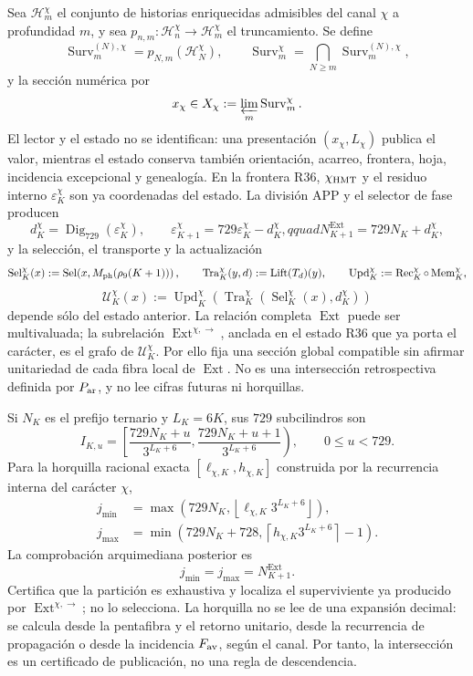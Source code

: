 Sea \(\mathcal H_m^\chi\) el conjunto de historias enriquecidas admisibles
del canal \(\chi\) a profundidad \(m\), y sea
\(p_{n,m}:\mathcal H_n^\chi\to\mathcal H_m^\chi\) el truncamiento. Se define
\[
 \operatorname{Surv}_{m}^{(N),\chi}
 =p_{N,m}(\mathcal H_N^\chi),\qquad
 \operatorname{Surv}_{m}^{\chi}
 =\bigcap_{N\ge m}\operatorname{Surv}_{m}^{(N),\chi},
\]
y la sección numérica por
\[
 x_\chi\in X_\chi:=
 \varprojlim_m\operatorname{Surv}_m^\chi.
\]
El lector y el estado no se identifican: una presentación
\((x_\chi,L_\chi)\) publica el valor, mientras el estado conserva también
orientación, acarreo, frontera, hoja, incidencia excepcional y genealogía.
En la frontera R36, \(\chi_{\rm HMT}\) y el residuo interno
\(\varepsilon_K^\chi\) son ya coordenadas del estado. La división APP y el
selector de fase producen
\[
 d_K^\chi=\operatorname{Dig}_{729}(\varepsilon_K^\chi),\qquad
 \varepsilon_{K+1}^\chi=729\varepsilon_K^\chi-d_K^\chi,qquad
 N_{K+1}^{\operatorname{Ext}}=729N_K+d_K^\chi,
\]
y la selección, el transporte y la actualización
\[
 \operatorname{Sel}_K^\chi(x)
 :=\operatorname{Sel}\!\left(
 x,M_{\rm ph}(\rho_9(K+1))\right),
 \qquad
 \operatorname{Tra}_K^\chi(y,d):=\operatorname{Lift}(T_d)(y),
 \qquad
 \operatorname{Upd}_K^\chi:=\operatorname{Rec}_K^\chi\circ
 \operatorname{Mem}_K^\chi,
\]
\[
 \mathcal U_K^\chi(x)
 :=\operatorname{Upd}_K^\chi\!\left(
  \operatorname{Tra}_K^\chi\!\left(
   \operatorname{Sel}_K^\chi(x),d_K^\chi
  \right)\right)
\]
depende sólo del estado anterior. La relación completa
\(\operatorname{Ext}\) puede ser multivaluada; la subrelación
\(\operatorname{Ext}^{\chi,\rightarrow}\), anclada en el estado R36 que ya
porta el carácter, es el grafo de \(\mathcal U_K^\chi\). Por ello fija
una sección global compatible sin afirmar unitariedad de cada fibra local de
\(\operatorname{Ext}\). No es una intersección retrospectiva definida por
\(P_{\rm ar}\), y no lee cifras futuras ni horquillas.

Si \(N_K\) es el prefijo ternario y \(L_K=6K\), sus \(729\) subcilindros son
\[
 I_{K,u}=
 \left[
 \frac{729N_K+u}{3^{L_K+6}},
 \frac{729N_K+u+1}{3^{L_K+6}}
 \right),
 \qquad 0\le u<729.
\]
Para la horquilla racional exacta \([\ell_{\chi,K},h_{\chi,K}]\) construida
por la recurrencia interna del carácter \(\chi\),
\[
\begin{aligned}
j_{\min}
 &=\max\!\left(729N_K,
   \left\lfloor\ell_{\chi,K}3^{L_K+6}\right\rfloor\right),\\
j_{\max}
 &=\min\!\left(729N_K+728,
   \left\lceil h_{\chi,K}3^{L_K+6}\right\rceil-1\right).
\end{aligned}
\]
La comprobación arquimediana posterior es
\[
 j_{\min}=j_{\max}=N_{K+1}^{\operatorname{Ext}}.
\]
Certifica que la partición es exhaustiva y localiza el superviviente ya
producido por \(\operatorname{Ext}^{\chi,\rightarrow}\); no lo selecciona.
La horquilla no se lee de una expansión decimal: se calcula
desde la pentafibra y el retorno unitario, desde la recurrencia de propagación
o desde la incidencia \(F_{\rm av}\), según el canal. Por tanto, la
intersección es un certificado de publicación, no una regla de descendencia.

